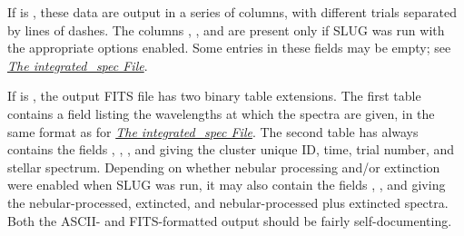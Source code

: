 \documentclass[letterpaper,10pt,english]{sphinxmanual}
\begin{document}
If  is , these data are output in a series of columns, with different trials separated by lines of dashes. The columns , , and  are present only if SLUG was run with the appropriate options enabled. Some entries in these fields may be empty; see {\hyperref[output:ssec\string-int\string-spec\string-file]{\emph{The integrated\_spec File}}}.

If  is , the output FITS file has two binary table extensions. The first table contains a field listing the wavelengths at which the spectra are given, in the same format as for {\hyperref[output:ssec\string-int\string-spec\string-file]{\emph{The integrated\_spec File}}}. The second table has always contains the fields , , , and  giving the cluster unique ID, time, trial number, and stellar spectrum. Depending on whether nebular processing and/or extinction were enabled when SLUG was run, it may also contain the fields , , and  giving the nebular-processed, extincted, and nebular-processed plus extincted spectra. Both the ASCII- and FITS-formatted output should be fairly self-documenting.
\end{document}
